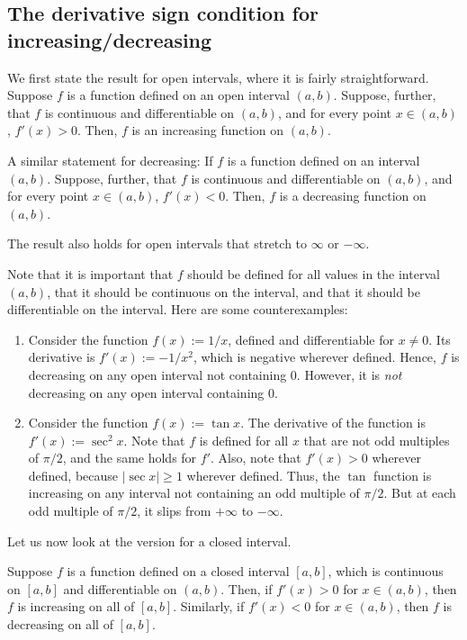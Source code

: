 \documentclass[10pt]{amsart}
\begin{document}
\subsection{The derivative sign condition for increasing/decreasing}

We first state the result for open intervals, where it is fairly
straightforward. Suppose $f$ is a function defined on an open interval
$(a,b)$. Suppose, further, that $f$ is continuous and differentiable
on $(a,b)$, and for every point $x \in (a,b)$, $f'(x) > 0$. Then, $f$
is an increasing function on $(a,b)$.

A similar statement for decreasing: If $f$ is a function defined on an
interval $(a,b)$. Suppose, further, that $f$ is continuous and
differentiable on $(a,b)$, and for every point $x \in (a,b)$, $f'(x) <
0$. Then, $f$ is a decreasing function on $(a,b)$.

The result also holds for open intervals that stretch to $\infty$ or
$-\infty$.

Note that it is important that $f$ should be defined for all
values in the interval $(a,b)$, that it should be continuous on the
interval, and that it should be differentiable on the interval. Here
are some counterexamples:

\begin{enumerate}

\item Consider the function $f(x) := 1/x$, defined and differentiable
  for $x \ne 0$. Its derivative is $f'(x) := -1/x^2$, which is
  negative wherever defined. Hence, $f$ is decreasing on any open
  interval not containing $0$. However, it is {\em not} decreasing on
  any open interval containing $0$.
\item Consider the function $f(x) := \tan x$. The derivative of the
  function is $f'(x) := \sec^2 x$. Note that $f$ is defined for all
  $x$ that are not odd multiples of $\pi/2$, and the same holds for
  $f'$. Also, note that $f'(x) > 0$ wherever defined, because $|\sec
  x| \ge 1$ wherever defined. Thus, the $\tan$ function is increasing
  on any interval not containing an odd multiple of $\pi/2$. But at
  each odd multiple of $\pi/2$, it slips from $+\infty$ to $-\infty$.

\end{enumerate}

Let us now look at the version for a closed interval. 

Suppose $f$ is a function defined on a closed interval $[a,b]$, which
is continuous on $[a,b]$ and differentiable on $(a,b)$. Then, if
$f'(x) > 0$ for $x \in (a,b)$, then $f$ is increasing on all of
$[a,b]$. Similarly, if $f'(x) < 0$ for $x \in (a,b)$, then $f$ is
decreasing on all of $[a,b]$.
\end{document}
